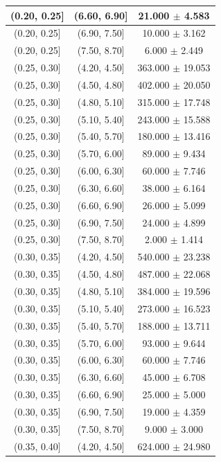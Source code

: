 \begin{longtable}{|c|c|c|}
\hline
(0.20, 0.25] & (6.60, 6.90] & 21.000 $\pm$ 4.583 \\ 
\hline
(0.20, 0.25] & (6.90, 7.50] & 10.000 $\pm$ 3.162 \\ 
\hline
(0.20, 0.25] & (7.50, 8.70] & 6.000 $\pm$ 2.449 \\ 
\hline
(0.25, 0.30] & (4.20, 4.50] & 363.000 $\pm$ 19.053 \\ 
\hline
(0.25, 0.30] & (4.50, 4.80] & 402.000 $\pm$ 20.050 \\ 
\hline
(0.25, 0.30] & (4.80, 5.10] & 315.000 $\pm$ 17.748 \\ 
\hline
(0.25, 0.30] & (5.10, 5.40] & 243.000 $\pm$ 15.588 \\ 
\hline
(0.25, 0.30] & (5.40, 5.70] & 180.000 $\pm$ 13.416 \\ 
\hline
(0.25, 0.30] & (5.70, 6.00] & 89.000 $\pm$ 9.434 \\ 
\hline
(0.25, 0.30] & (6.00, 6.30] & 60.000 $\pm$ 7.746 \\ 
\hline
(0.25, 0.30] & (6.30, 6.60] & 38.000 $\pm$ 6.164 \\ 
\hline
(0.25, 0.30] & (6.60, 6.90] & 26.000 $\pm$ 5.099 \\ 
\hline
(0.25, 0.30] & (6.90, 7.50] & 24.000 $\pm$ 4.899 \\ 
\hline
(0.25, 0.30] & (7.50, 8.70] & 2.000 $\pm$ 1.414 \\ 
\hline
(0.30, 0.35] & (4.20, 4.50] & 540.000 $\pm$ 23.238 \\ 
\hline
(0.30, 0.35] & (4.50, 4.80] & 487.000 $\pm$ 22.068 \\ 
\hline
(0.30, 0.35] & (4.80, 5.10] & 384.000 $\pm$ 19.596 \\ 
\hline
(0.30, 0.35] & (5.10, 5.40] & 273.000 $\pm$ 16.523 \\ 
\hline
(0.30, 0.35] & (5.40, 5.70] & 188.000 $\pm$ 13.711 \\ 
\hline
(0.30, 0.35] & (5.70, 6.00] & 93.000 $\pm$ 9.644 \\ 
\hline
(0.30, 0.35] & (6.00, 6.30] & 60.000 $\pm$ 7.746 \\ 
\hline
(0.30, 0.35] & (6.30, 6.60] & 45.000 $\pm$ 6.708 \\ 
\hline
(0.30, 0.35] & (6.60, 6.90] & 25.000 $\pm$ 5.000 \\ 
\hline
(0.30, 0.35] & (6.90, 7.50] & 19.000 $\pm$ 4.359 \\ 
\hline
(0.30, 0.35] & (7.50, 8.70] & 9.000 $\pm$ 3.000 \\ 
\hline
(0.35, 0.40] & (4.20, 4.50] & 624.000 $\pm$ 24.980 \\ 

\end{longtable}
